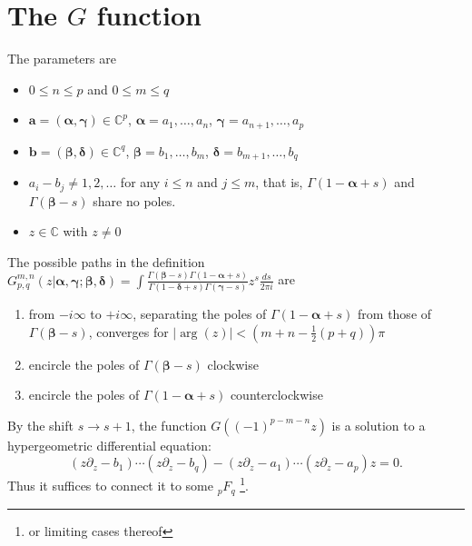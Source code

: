 \documentclass[12pt]{article}
\newcommand{\ii}[0] {i}
\numberwithin{equation}{section}
\newcommand{\bfa}[0] {\mathbf{a}}
\newcommand{\bfb}[0] {\mathbf{b}}
\begin{document}
\section{The $G$ function}

\newcommand{\bfalpha}[0] {\pmb{\alpha}}
\newcommand{\bfgamma}[0] {\pmb{\gamma}}
\newcommand{\bfbeta}[0]  {\pmb{\beta}}
\newcommand{\bfdelta}[0] {\pmb{\delta}}

The parameters are
\begin{itemize}
\item{$0 \le n \le p$ and $0 \le m \le q$}
\item{$\bfa = (\bfalpha, \bfgamma) \in \mathbb{C}^{p}$, $\bfalpha = a_1, \dots, a_n$, $\bfgamma = a_{n+1}, \dots, a_p$}
\item{$\bfb = (\bfbeta, \bfdelta) \in \mathbb{C}^{q}$, $\bfbeta = b_1, \dots, b_m$, $\bfdelta = b_{m+1}, \dots, b_q$}
\item{$a_i-b_j \neq 1, 2, \dots$ for any $i \le n$ and $j \le m$, that is, $\Gamma(1-\bfalpha+s)$ and $\Gamma(\bfbeta-s)$ share no poles.}
\item{$z \in \mathbb{C}$ with $z \neq 0$}
\end{itemize}
The possible paths in the definition $ G_{p,q}^{m,n} (z |\bfalpha, \bfgamma; \bfbeta, \bfdelta) = \int \frac{\Gamma(\bfbeta-s)\Gamma(1-\bfalpha+s)}{\Gamma(1-\bfdelta+s)\Gamma(\bfgamma-s)}z^s\frac{ds}{2 \pi \ii}$ are
\begin{enumerate}
\item{from $-\ii \infty$ to $+ \ii \infty$, separating the poles of $\Gamma(1-\bfalpha+s)$ from those of $\Gamma(\bfbeta-s)$, converges for $|\arg(z)| < (m+n-\tfrac{1}{2}(p+q)) \pi$}
\item{encircle the poles of $\Gamma(\bfbeta-s)$ clockwise}
\item{encircle the poles of $\Gamma(1-\bfalpha+s)$ counterclockwise}
\end{enumerate}
By the shift $s \to s+1$, the function $G((-1)^{p-m-n}z)$ is a solution to a hypergeometric differential equation:
\begin{equation*}
(z \partial_z - b_1)\cdots (z \partial_z - b_q)-(z \partial_z - a_1) \cdots (z \partial_z - a_p) z = 0\text{.}
\end{equation*}
Thus it suffices to connect it to some ${}_p F_q$ \footnote{or limiting cases thereof}.
\end{document}
